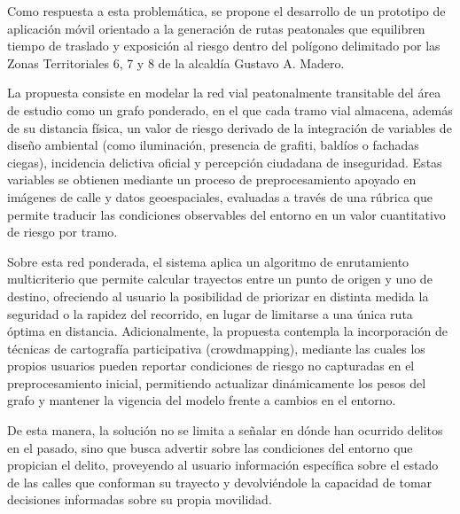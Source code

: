 
Como respuesta a esta problemática, se propone el desarrollo de un prototipo de aplicación móvil orientado a la generación de rutas peatonales que equilibren tiempo de traslado y exposición al riesgo dentro del polígono delimitado por las Zonas Territoriales 6, 7 y 8 de la alcaldía Gustavo A. Madero.

La propuesta consiste en modelar la red vial peatonalmente transitable del área de estudio como un grafo ponderado, en el que cada tramo vial almacena, además de su distancia física, un valor de riesgo derivado de la integración de variables de diseño ambiental (como iluminación, presencia de grafiti, baldíos o fachadas ciegas), incidencia delictiva oficial y percepción ciudadana de inseguridad. Estas variables se obtienen mediante un proceso de preprocesamiento apoyado en imágenes de calle y datos geoespaciales, evaluadas a través de una rúbrica que permite traducir las condiciones observables del entorno en un valor cuantitativo de riesgo por tramo.

Sobre esta red ponderada, el sistema aplica un algoritmo de enrutamiento multicriterio que permite calcular trayectos entre un punto de origen y uno de destino, ofreciendo al usuario la posibilidad de priorizar en distinta medida la seguridad o la rapidez del recorrido, en lugar de limitarse a una única ruta óptima en distancia. Adicionalmente, la propuesta contempla la incorporación de técnicas de cartografía participativa (crowdmapping), mediante las cuales los propios usuarios pueden reportar condiciones de riesgo no capturadas en el preprocesamiento inicial, permitiendo actualizar dinámicamente los pesos del grafo y mantener la vigencia del modelo frente a cambios en el entorno.

De esta manera, la solución no se limita a señalar en dónde han ocurrido delitos en el pasado, sino que busca advertir sobre las condiciones del entorno que propician el delito, proveyendo al usuario información específica sobre el estado de las calles que conforman su trayecto y devolviéndole la capacidad de tomar decisiones informadas sobre su propia movilidad.
